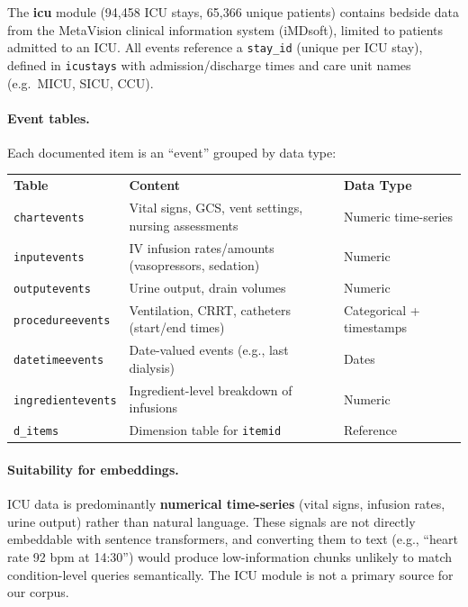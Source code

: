 \documentclass[11pt,a4paper]{article}
\newcommand{\field}[1]{\nolinkurl{#1}}
\newcommand{\mr}{\specialrule{0.4pt}{4pt}{4pt}}
\newcommand{\tr}{\specialrule{0.8pt}{4pt}{6pt}}
\begin{document}
The \textbf{icu} module (94,458 ICU stays, 65,366 unique patients) contains bedside data
from the MetaVision clinical information system (iMDsoft), limited to patients admitted to
an ICU.  All events reference a \field{stay\_id} (unique per ICU stay), defined in
\field{icustays} with admission/discharge times and care unit names (e.g.\ MICU, SICU, CCU).

\paragraph{Event tables.}
Each documented item is an ``event'' grouped by data type:

\begin{center}
	\small
	\begin{tabular}{lll}
		\tr
		\textbf{Table}           & \textbf{Content}                                     & \textbf{Data Type}       \\
		\mr
		\field{chartevents}      & Vital signs, GCS, vent settings, nursing assessments & Numeric time-series      \\
		\field{inputevents}      & IV infusion rates/amounts (vasopressors, sedation)   & Numeric                  \\
		\field{outputevents}     & Urine output, drain volumes                          & Numeric                  \\
		\field{procedureevents}  & Ventilation, CRRT, catheters (start/end times)       & Categorical + timestamps \\
		\field{datetimeevents}   & Date-valued events (e.g., last dialysis)             & Dates                    \\
		\field{ingredientevents} & Ingredient-level breakdown of infusions              & Numeric                  \\
		\field{d\_items}         & Dimension table for \field{itemid}                   & Reference                \\
		\bottomrule
	\end{tabular}
\end{center}

\paragraph{Suitability for embeddings.}
ICU data is predominantly \textbf{numerical time-series} (vital signs, infusion rates, urine output) rather than natural language.  These signals are not directly embeddable with sentence transformers, and converting them to text (e.g., ``heart rate 92 bpm at 14:30'') would produce low-information chunks unlikely to match condition-level queries semantically.  The ICU module is not a primary source for our corpus.
\end{document}
